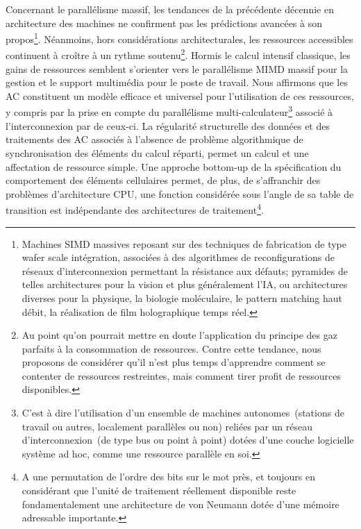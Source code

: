 Concernant le parallélisme massif, les tendances de la précédente
décennie en architecture des machines ne confirment pas les
prédictions avancées à son propos\footnote{%
  Machines SIMD massives reposant sur des techniques de fabrication de
  type wafer scale intégration, associées à des algorithmes de
  reconfigurations de réseaux d'interconnexion permettant la
  résistance aux défauts; pyramides de telles architectures pour la
  vision et plus généralement l'IA, ou architectures diverses pour la
  physique, la biologie moléculaire, le pattern matching haut débit,
  la réalisation de film holographique temps réel.}. %
Néanmoins, hors considérations architecturales, les ressources
accessibles continuent à croître à un rythme soutenu\footnote{%
  Au point qu'on pourrait mettre en doute l'application du
  principe des gaz parfaits à la consommation de ressources. %
  Contre cette tendance, nous proposons de considérer qu'il n'est plus
  temps d'apprendre comment se contenter de ressources restreintes,
  mais comment tirer profit de ressources disponibles.}. %
Hormis le calcul intensif classique, les gains de ressources semblent
s'orienter vers le parallélisme MIMD massif pour la gestion et le
support multimédia pour le poste de travail. %
Nous affirmons que les AC constituent un modèle efficace et universel
pour l'utilisation de ces ressources, y compris par la prise en compte
du parallélisme multi-calculateur\footnote{%
  C'est à dire l'utilisation d'un ensemble de machines
  autonomes~(stations de travail ou autres, localement parallèles ou
  non) reliées par un réseau d'interconnexion~(de type bus ou point
  à point) dotées d'une couche logicielle système ad hoc, comme une
  ressource parallèle en soi.} %
associé à l'interconnexion par  %
de ceux-ci. %
La régularité structurelle des données et des traitements des AC
associés à l'absence de problème algorithmique de synchronisation
des éléments du calcul réparti, permet un calcul et une affectation de
ressource simple. %
Une approche bottom-up de la spécification du comportement des
éléments cellulaires permet, de plus, de s'affranchir des problèmes
d'architecture CPU, une fonction considérée sous l'angle de sa table
de transition est indépendante des architectures de
traitement\footnote{%
  A une permutation de l'ordre des bits sur le mot près, et toujours en
  considérant que l'unité de traitement réellement disponible reste
  fondamentalement une architecture de von Neumann dotée d'une mémoire
  adressable importante.}. %

